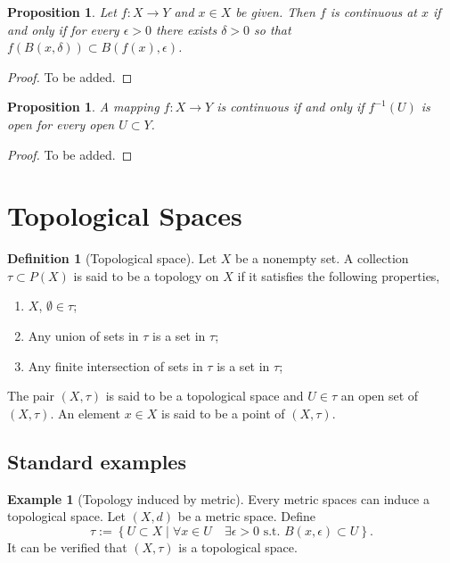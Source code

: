 \documentclass[11pt,a4paper]{article}
\theoremstyle{definition}
\newtheorem{definition}{Definition}[section]
\newtheorem{example}{Example}[section]
\theoremstyle{plain}
\newtheorem{proposition}[theorem]{Proposition}
\newcommand{\st}{\text{ s.t. }}
\newcommand{\set}[2]{ \left\{ #1 \mid #2 \right\} }
\begin{document}
  \begin{proposition}
    Let $f \colon X \to Y$ and $x \in X$ be given. Then $f$ is continuous
    at $x$ if and only if for every $\epsilon > 0$ there exists $\delta > 0$
    so that $f(B(x,\delta)) \subset B(f(x),\epsilon)$.
  \end{proposition}
  \begin{proof}
    To be added.
  \end{proof}

  \begin{proposition}
    A mapping $f \colon X \to Y$ is continuous if and only if $f^{-1}(U)$
    is open for every open $U \subset Y$.
  \end{proposition}
  \begin{proof}
    To be added.
  \end{proof}

  \newpage

  \section{Topological Spaces}\label{sec:topological-spaces}
  \begin{definition}[Topological space]
    Let $X$ be a nonempty set. A collection $\tau \subset P(X)$ is said to
    be a topology on $X$ if it satisfies the following properties,
    \begin{enumerate}
      \item[(1)] $X$, $\emptyset \in \tau$;
      \item[(2)] Any union of sets in $\tau$ is a set in $\tau$;
      \item[(3)] Any finite intersection of sets in $\tau$ is a set in $\tau$;
    \end{enumerate}
    The pair $(X,\tau)$ is said to be a topological space and $U \in \tau$
    an open set of $(X,\tau)$. An element $x \in X$ is said to be a point
    of $(X,\tau)$.
  \end{definition}

  \subsection{Standard examples}

  \begin{example}[Topology induced by metric]
    Every metric spaces can induce a topological space. Let $(X,d)$ be a
    metric space. Define
    \[
      \tau := \set{U \subset X}{\forall x \in U \quad \exists \epsilon > 0
      \st B(x,\epsilon) \subset U}.
    \]
    It can be verified that $(X,\tau)$ is a topological space.
  \end{example}
\end{document}
